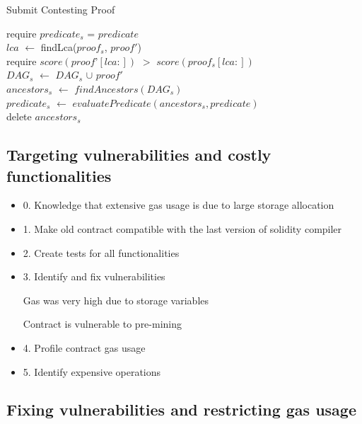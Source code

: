\begin{algorithm}
    \caption{Submit Contesting Proof}
    \label{algo:contest_old}
    require $predicate_{s}$ = $predicate$\\
    $lca$ $\leftarrow$ findLca($proof_{s}$, $proof'$)\\
    require $score(proof’[lca:])$ $>$ $score(proof_{s}[lca:])$ \\
    $DAG_{s}$ $\leftarrow$ $DAG_{s}$ $\cup$ $proof'$\\
    $ancestors_{s}$ $\leftarrow$ $findAncestors(DAG_{s})$\\
    $predicate_{s}$ $\leftarrow$ $evaluatePredicate(ancestors_{s},
    predicate)$\\
    delete $ancestors_{s}$\\
\end{algorithm}

\subsection{Targeting vulnerabilities and costly functionalities}

\begin{itemize}
    \item
        0. Knowledge that extensive gas usage is due to large storage
        allocation
    \item
        1. Make old contract compatible with the last version of solidity
        compiler
    \item
        2. Create tests for all functionalities
    \item
        3. Identify and fix vulnerabilities

        Gas was very high due to storage variables

        Contract is vulnerable to pre-mining
    \item
        4. Profile contract gas usage
    \item
        5. Identify expensive operations
\end{itemize}

\subsection{Fixing vulnerabilities and restricting gas usage}

